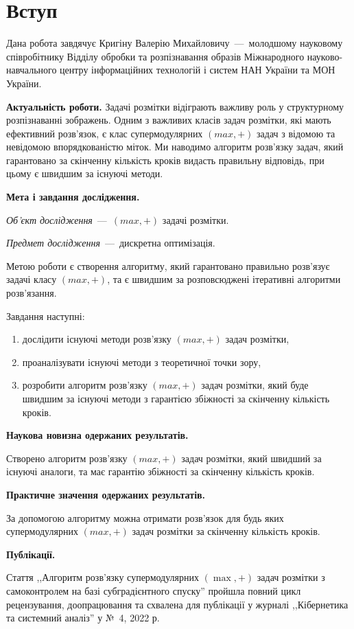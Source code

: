 \chapter*{Вступ}

Дана робота завдячує Кригіну Валерію Михайловичу~---~молодшому
науковому співробітнику Відділу обробки та розпізнавання
образів Міжнародного науково-навчального центру інформаційних
технологій і систем НАН України та МОН України.

\textbf{Актуальність роботи.}
Задачі розмітки відіграють важливу роль у структурному розпізнаванні
зображень. Одним з важливих класів задач
розмітки, які мають ефективний розв’язок, є клас супермодулярних
\((max,+)\) задач з відомою  та невідомою впорядкованістю міток.
Ми наводимо алгоритм розв'язку задач, який гарантовано за скінченну кількість
кроків видасть правильну відповідь, при цьому є швидшим за існуючі методи.

\textbf{Мета і завдання дослідження.}

\textit{Об'єкт дослідження}~---~\((max,+)\) задачі розмітки.

\textit{Предмет дослідження}~---~дискретна оптимізація.

Метою роботи є створення алгоритму, який гарантовано правильно розв'язує задачі класу 
\((max,+)\), та є швидшим за розповсюджені ітеративні алгоритми розв'язання.

Завдання наступні:
\begin{enumerate}
  \item
    дослідити існуючі методи розв'язку \((max,+)\) задач розмітки,
  \item
    проаналізувати існуючі методи з теоретичної точки зору,
  \item
    розробити алгоритм розв'язку \((max,+)\) задач розмітки, який буде
    швидшим за існуючі методи з гарантією збіжності за скінченну
    кількість кроків.
\end{enumerate}

\textbf{Наукова новизна одержаних результатів.}

Створено алгоритм розв'язку \((max,+)\) задач розмітки, який швидший за
існуючі аналоги, та має гарантію збіжності за скінченну кількість кроків. 

\textbf{Практичне значення одержаних результатів.}

За допомогою алгоритму можна отримати розв'язок для будь яких 
супермодулярних \((max,+)\) задач розмітки за скінченну кількість кроків.

\textbf{Публікації.}

Стаття ,,Алгоритм розв'язку супермодулярних $(\max, +)$ задач
розмітки з самоконтролем на базі субградієнтного спуску''
пройшла повний цикл рецензування, доопрацювання та схвалена для 
публікації у журналі
,,Кібернетика та системний аналіз'' у № 4, 2022 р.